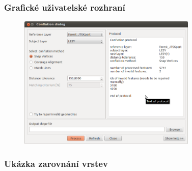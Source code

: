 \documentclass[unicode,bookmarksnumbered]{beamer}
\begin{document}
  \begin{frame}
  \frametitle{Grafické uživatelské rozhraní}
     \begin{figure}
	  \centering
             \includegraphics[height=2.5in]{./pictures/dialog4.png}
	  \label{fig:dialog2}
	  \end{figure}
  \end{frame}


  \begin{frame}
  \frametitle{Ukázka zarovnání vrstev}
     \begin{figure}
	  \centering
	  \scriptsize
	    \def\svgwidth{4in}
             
	  \label{fig:ukazka}
	  \end{figure}
  \end{frame}



\end{document}
